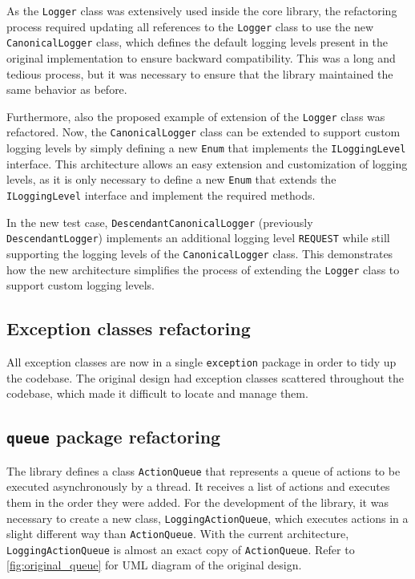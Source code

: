 As the \texttt{Logger} class was extensively used inside the core library, the refactoring process required updating all references to the \texttt{Logger} class to use the new \texttt{CanonicalLogger} class, which defines the default logging levels present in the original implementation to ensure backward compatibility. This was a long and tedious process, but it was necessary to ensure that the library maintained the same behavior as before.

Furthermore, also the proposed example of extension of the \texttt{Logger} class was refactored. Now, the \texttt{CanonicalLogger} class can be extended to support custom logging levels by simply defining a new \texttt{Enum} that implements the \texttt{ILoggingLevel} interface. This architecture allows an easy extension and customization of logging levels, as it is only necessary to define a new \texttt{Enum} that extends the \texttt{ILoggingLevel} interface and implement the required methods.

In the new test case, \texttt{DescendantCanonicalLogger} (previously \texttt{DescendantLogger}) implements an additional logging level \texttt{REQUEST} while still supporting the logging levels of the \texttt{CanonicalLogger} class. This demonstrates how the new architecture simplifies the process of extending the \texttt{Logger} class to support custom logging levels.

\subsection{Exception classes refactoring}

All exception classes are now in a single \texttt{exception} package in order to tidy up the codebase. The original design had exception classes scattered throughout the codebase, which made it difficult to locate and manage them.

\subsection{\texttt{queue} package refactoring}

The library defines a class \texttt{ActionQueue} that represents a queue of actions to be executed asynchronously by a thread. It receives a list of actions and executes them in the order they were added. For the development of the library, it was necessary to create a new class, \texttt{LoggingActionQueue}, which executes actions in a slight different way than \texttt{ActionQueue}. With the current architecture, \texttt{LoggingActionQueue} is almost an exact copy of \texttt{ActionQueue}. Refer to \autoref{fig:original_queue} for UML diagram of the original design.

